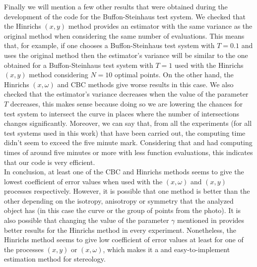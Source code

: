 Finally we will mention a few other results that were obtained during the development of the code for the Buffon-Steinhaus test system.  We checked that the Hinrichs $(x,y)$ method provides an estimator with the same variance as the original method when considering the same number of evaluations. This means that, for example, if one chooses a Buffon-Steinhaus test system with $T=0.1$ and uses the original method then the estimator's variance will be similar to the one obtained for a Buffon-Steinhaus test system with $T=1$ used with the Hinrichs $(x,y)$ method considering $N=10$ optimal points. On the other hand, the Hinrichs $(x,\omega)$ and CBC methods give worse results in this case. We also checked that the estimator's variance decreases when the value of the parameter $T$ decreases, this makes sense because doing so we are lowering the chances for test system to intersect the curve in places where the number of intersections changes significantly. Moreover, we can say that, from all the experiments (for all test systems used in this work) that have been carried out, the computing time didn't seem to exceed the five minute mark. Considering that \cite{conteo.pdf} and \cite{adn.pdf} had computing times of around five minutes or more with less function evaluations, this indicates that our code is very efficient.\\











In conclusion, at least one of the CBC and Hinrichs methods seems to give the lowest coefficient of error values when used with the $(x,\omega)$ and $(x,y)$ processes respectively. However, it is possible that one method is better than the other depending on the isotropy, anisotropy or symmetry that the analyzed object has (in this case the curve or the group of points from the photo). It is also possible that changing the value of the parameter $\gamma$ mentioned in \cite{Hinrichs.pdf} provides better results for the Hinrichs method in every experiment. Nonetheless, the Hinrichs method seems to give low coefficient of error values at least for one of the processes $(x,y)$ or $(x,\omega)$, which makes it a and easy-to-implement estimation method for stereology.\\






